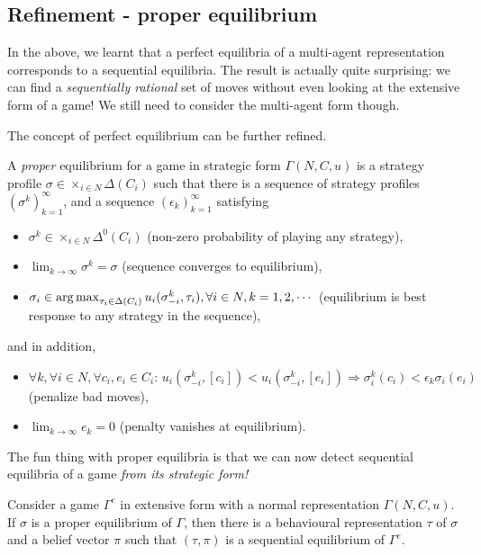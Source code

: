 \subsection{Refinement - proper equilibrium}

In the above, we learnt that a perfect equilibria of a multi-agent representation corresponds to a sequential equilibria. The result is actually quite surprising: we can find a \emph{sequentially rational} set of moves without even looking at the extensive form of a game! We still need to consider the multi-agent form though.

The concept of perfect equilibrium can be further refined. 
\begin{definition}
A \emph{proper} equilibrium for a game in strategic form $\Gamma(N,C,u)$ is a strategy profile $\sigma \in \times_{i \in N} \Delta (C_i)$ such that there is a sequence of strategy profiles $ (\sigma^k)_{k = 1}^\infty$, and a sequence $(\epsilon_k)_{k = 1}^{\infty}$ satisfying 
\begin{itemize}
\item $\sigma^k \in \times_{i \in N} \Delta^0 (C_i)$ (non-zero probability of playing any strategy), 
\item $\lim_{k \rightarrow \infty} \sigma^k = \sigma$ (sequence converges to equilibrium), 
\item $ \sigma_i \in \operatorname*{arg\,max}_{\tau_i \in \Delta(C_i)}u_i(\sigma^k_{-i}, \tau_i), \forall i \in N, k = 1,2, \cdots $ (equilibrium is best response to any strategy in the sequence), 
\end{itemize}
and in addition,
\begin{itemize}
\item $\forall k, \forall i \in N, \forall c_i, e_i \in C_i: \, u_i(\sigma_{-i}^k, [c_i]) < u_i(\sigma_{-i}^k, [e_i]) \Rightarrow \sigma^k_i(c_i) < \epsilon_k \sigma_i(e_i)$ (penalize bad moves),
\item $\lim_{k \rightarrow \infty} e_k = 0$ (penalty vanishes at equilibrium).
\end{itemize}
\label{ch5:def:properEq}
\end{definition}

The fun thing with proper equilibria is that we can now detect sequential equilibria of a game \emph{from its strategic form!}

\begin{theorem}
Consider a game $\Gamma^e$ in extensive form with a normal representation $\Gamma(N,C,u)$. 
If $\sigma$ is a proper equilibrium of $\Gamma$, then there is a behavioural representation $\tau$ of $\sigma$ and a belief vector $\pi$ such that $(\tau, \pi)$ is a sequential equilibrium of $\Gamma^e$.
\end{theorem}

